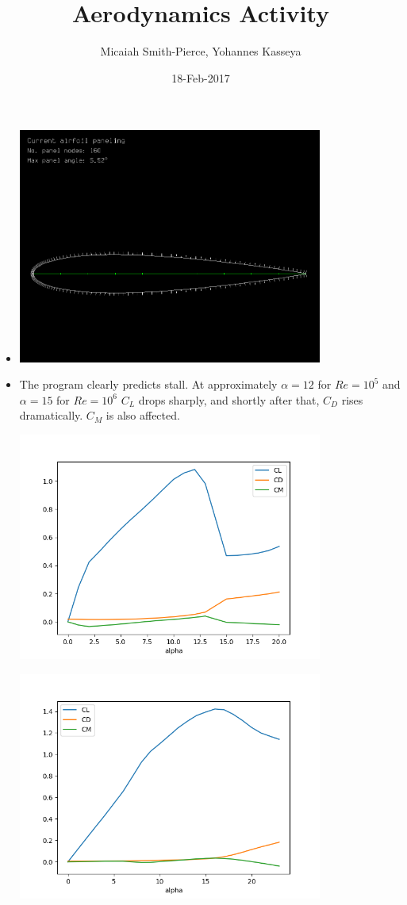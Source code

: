 \documentclass{article}
\title{Aerodynamics Activity}
\author{Micaiah Smith-Pierce, Yohannes Kasseya}
\date{18-Feb-2017}
\begin{document}
\maketitle
\begin{itemize}
\item{}
\includegraphics[width = 10cm]{coordinate_plot.png}

\item{The program clearly predicts stall.  At approximately $\alpha = 12$ for $Re = 10^5$ and $\alpha = 15$ for $Re = 10^6$ $C_L$ drops sharply,
and shortly after that, $C_D$ rises dramatically.  $C_M$ is also affected.}

\includegraphics[width = 10cm]{reE5.png}

\includegraphics[width = 10cm]{reE6.png}


\end{itemize}
\end{document}
